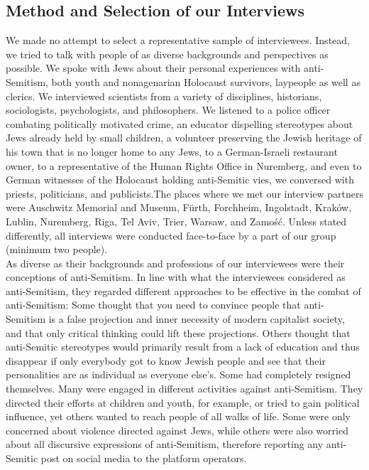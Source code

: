 \subsection*{Method and Selection of our Interviews}
We made no attempt to select a representative sample of interviewees. Instead, we tried to talk with people of as diverse backgrounds and perspectives as possible. We spoke with Jews about their personal experiences with anti-Semitism, both youth and nonagenarian Holocaust survivors, laypeople as well as clerics. We interviewed scientists from a variety of disciplines, historians, sociologists, psychologists, and philosophers. We listened to a police officer combating politically motivated crime, an educator dispelling stereotypes about Jews already held by small children, a volunteer preserving the Jewish heritage of his town that is no longer home to any Jews, to a German-Israeli restaurant owner, to a representative of the Human Rights Office in Nuremberg, and even to German witnesses of the Holocaust holding anti-Semitic vies, we conversed with priests, politicians, and publicists.The places where we met our interview partners were Auschwitz Memorial and Museum, Fürth, Forchheim, Ingolstadt, Kraków, Lublin, Nuremberg, Riga, Tel Aviv, Trier, Warsaw, and Zamość. Unless stated differently, all interviews were conducted face-to-face by a part of our group (minimum two people). \\
As diverse as their backgrounds and professions of our interviewees were their conceptions of anti-Semitism. In line with what the interviewees considered as anti-Semitism, they regarded different approaches to be effective in the combat of anti-Semitism: Some thought that you need to convince people that anti-Semitism is a false projection and inner necessity of modern capitalist society, and that only critical thinking could lift these projections. Others thought that anti-Semitic stereotypes would primarily result from a lack of education and thus disappear if only everybody got to know Jewish people and see that their personalities are as individual as everyone else's. Some had completely resigned themselves. Many were engaged in different activities against anti-Semitism. They directed their efforts at children and youth, for example, or tried to gain political influence, yet others wanted to reach people of all walks of life. Some were only concerned about violence directed against Jews, while others were also worried about all discursive expressions of anti-Semitism, therefore reporting any anti-Semitic post on social media to the platform operators. 
